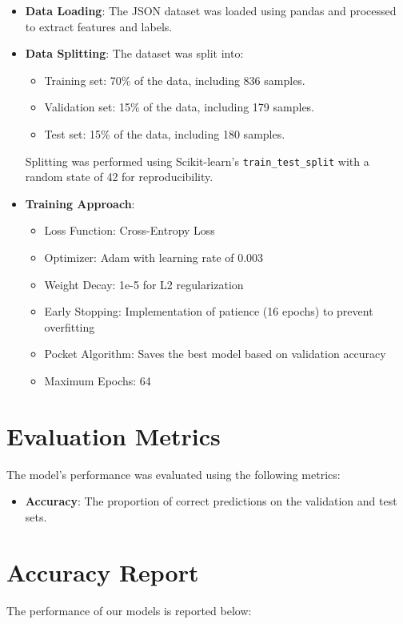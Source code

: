 \documentclass[12pt, a4paper]{article}
\begin{document}
\begin{itemize}
    \item \textbf{Data Loading}: The JSON dataset was loaded using pandas and processed to extract features and labels.
    \item \textbf{Data Splitting}: The dataset was split into:
        \begin{itemize}
            \item Training set: 70\% of the data, including 836 samples.
            \item Validation set: 15\% of the data, including 179 samples.
            \item Test set: 15\% of the data, including 180 samples.
        \end{itemize}
        Splitting was performed using Scikit-learn's \texttt{train\_test\_split} with a random state of 42 for reproducibility.
    \item \textbf{Training Approach}:
                \begin{itemize}
                    \item Loss Function: Cross-Entropy Loss
                    \item Optimizer: Adam with learning rate of 0.003
                    \item Weight Decay: 1e-5 for L2 regularization
                    \item Early Stopping: Implementation of patience (16 epochs) to prevent overfitting
                    \item Pocket Algorithm: Saves the best model based on validation accuracy
                    \item Maximum Epochs: 64
                \end{itemize}
\end{itemize}

\section{Evaluation Metrics}
The model’s performance was evaluated using the following metrics:

\begin{itemize}
    \item \textbf{Accuracy}: The proportion of correct predictions on the validation and test sets.
\end{itemize}

\section{Accuracy Report}
The performance of our models is reported below:
\end{document}
